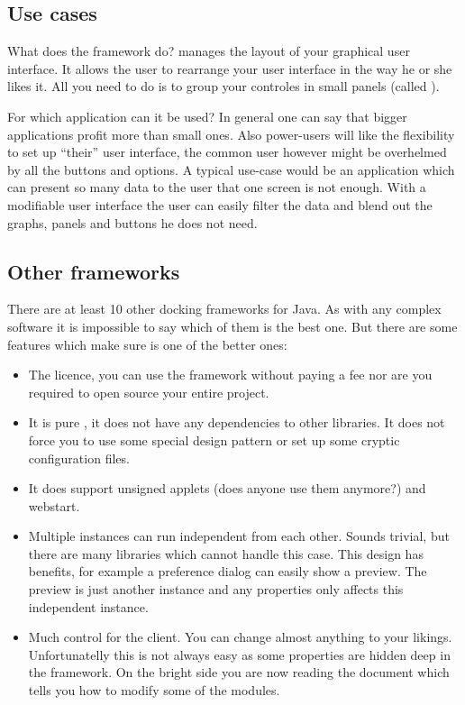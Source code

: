 
\subsection{Use cases}
What does the framework do?  manages the layout of your graphical user interface. It allows the user to rearrange your user interface in the way he or she likes it. All you need to do is to group your controles in small panels (called ).

For which application can it be used? In general one can say that bigger applications profit more than small ones. Also power-users will like the flexibility to set up ``their'' user interface, the common user however might be overhelmed by all the buttons and options. A typical use-case would be an application which can present so many data to the user that one screen is not enough. With a modifiable user interface the user can easily filter the data and blend out the graphs, panels and buttons he does not need.

\subsection{Other frameworks}
There are at least 10 other docking frameworks for Java. As with any complex software it is impossible to say which of them is the best one. But there are some features which make sure  is one of the better ones:

\begin{itemize}
 \item The licence, you can use the framework without paying a fee nor are you required to open source your entire project.
 \item It is pure , it does not have any dependencies to other libraries. It does not force you to use some special design pattern or set up some cryptic configuration files.
 \item It does support unsigned applets (does anyone use them anymore?) and webstart.
 \item Multiple instances can run independent from each other. Sounds trivial, but there are many libraries which cannot handle this case. This design has benefits, for example a preference dialog can easily show a preview. The preview is just another instance and any properties only affects this independent instance.
 \item Much control for the client. You can change almost anything to your likings. Unfortunatelly this is not always easy as some properties are hidden deep in the framework. On the bright side you are now reading the document which tells you how to modify some of the modules.
\end{itemize}


